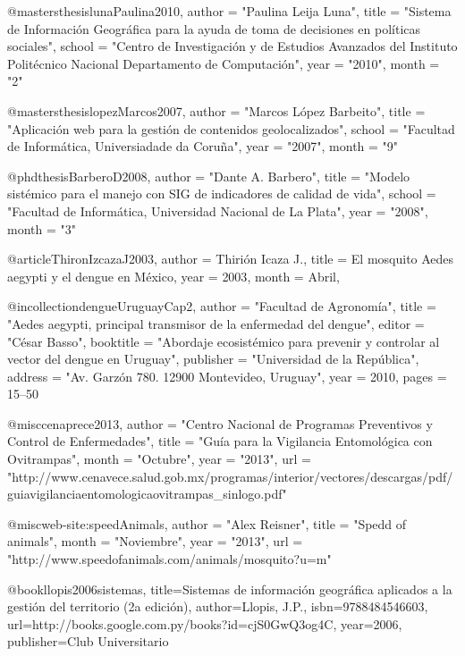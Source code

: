@mastersthesis{lunaPaulina2010,
    author    = "Paulina Leija Luna",
    title     = "Sistema de Información Geográfica para la ayuda de toma de decisiones en políticas sociales",
    school    = "Centro de Investigación y de Estudios Avanzados del Instituto Politécnico Nacional Departamento de Computación",
    year      = "2010",
    month     = "2"
}

@mastersthesis{lopezMarcos2007,
    author    = "Marcos López Barbeito",
    title     = "Aplicación web para la gestión de contenidos geolocalizados",
    school    = "Facultad de Informática, Universiadade da Coruña",
    year      = "2007",
    month     = "9"
}

@phdthesis{BarberoD2008,
    author    = "Dante A. Barbero",
    title     = "Modelo sistémico para el manejo con SIG de indicadores de calidad de vida",
    school    = "Facultad de Informática, Universidad Nacional de La Plata",
    year      = "2008",
    month     = "3"
}

@article{ThironIzcazaJ2003,
    author = {Thirión Icaza J.},
    title = {El mosquito Aedes aegypti y el dengue en México},
    year = {2003},
    month = {Abril},
}

@incollection{dengueUruguayCap2,
  author      = "Facultad de Agronomía",
  title       = "Aedes aegypti, principal transmisor de la enfermedad del dengue",
  editor      = "César Basso",
  booktitle   = "Abordaje ecosistémico para prevenir y controlar al vector del dengue en Uruguay",
  publisher   = "Universidad de la República",
  address     = "Av. Garzón 780. 12900 Montevideo, Uruguay",
  year        = 2010,
  pages = {15--50}
}

@misc{cenaprece2013,
      author = "Centro Nacional de Programas Preventivos y Control de Enfermedades",
      title = "Guía para la Vigilancia Entomológica con Ovitrampas",
      month = "Octubre",
      year = "2013",
      url = "http://www.cenavece.salud.gob.mx/programas/interior/vectores/descargas/pdf/guiavigilanciaentomologicaovitrampas_sinlogo.pdf"
}


@misc{web-site:speedAnimals,
      author = "Alex Reisner",
      title = "Spedd of animals",
      month = "Noviembre",
      year = "2013",
      url = "http://www.speedofanimals.com/animals/mosquito?u=m"
}

@book{llopis2006sistemas,
  title={Sistemas de informaci{\'o}n geogr{\'a}fica aplicados a la gesti{\'o}n del territorio (2a edici{\'o}n)},
  author={Llopis, J.P.},
  isbn={9788484546603},
  url={http://books.google.com.py/books?id=cjS0GwQ3og4C},
  year={2006},
  publisher={Club Universitario}
}

